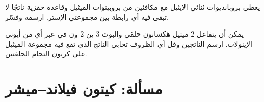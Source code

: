 \begin{exercise}[$\star\star\star$]\label{exo:b2:conjugate-additions:11}
يعطي بروبانديوات ثنائي الإيثيل مع مكافئين من بروبينوات الميثيل وقاعدة حفزية ناتجًا
لا تبقى فيه أي رابطة  بين مجموعتي الإستر. ارسمه وفسّر.
\end{exercise}

\begin{exercise}[$\star\star\star$]\label{exo:b2:conjugate-additions:12}
يمكن أن يتفاعل 2-ميثيل هكسانون حلقي والبوت-3-ين-2-ون في  عبر أي من أيوني الإينولات.
ارسم الناتجين وقل أي الظروف تحابي الناتج الذي تقع فيه مجموعة الميثيل على كربون التحام
الحلقتين.
\end{exercise}

\section{مسألة: كيتون فيلاند--ميشر}

